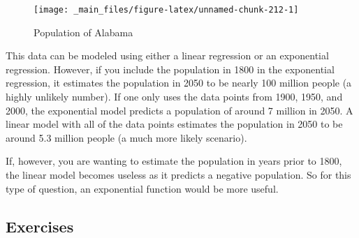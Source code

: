 \documentclass[
]{book}
\theoremstyle{definition}
\theoremstyle{definition}
\theoremstyle{definition}
\theoremstyle{remark}
\begin{document}
\begin{figure}

{\centering \texttt{[image: \_main\_files/figure-latex/unnamed-chunk-212-1]} 

}

\caption{Population of Alabama}\label{fig:unnamed-chunk-212}
\end{figure}

This data can be modeled using either a linear regression or an exponential regression. However, if you include the population in 1800 in the exponential regression, it estimates the population in 2050 to be nearly 100 million people (a highly unlikely number). If one only uses the data points from 1900, 1950, and 2000, the exponential model predicts a population of around 7 million in 2050. A linear model with all of the data points estimates the population in 2050 to be around 5.3 million people (a much more likely scenario).

If, however, you are wanting to estimate the population in years prior to 1800, the linear model becomes useless as it predicts a negative population. So for this type of question, an exponential function would be more useful.

\hypertarget{exercises-29}{%
\subsection{Exercises}\label{exercises-29}}
\end{document}
